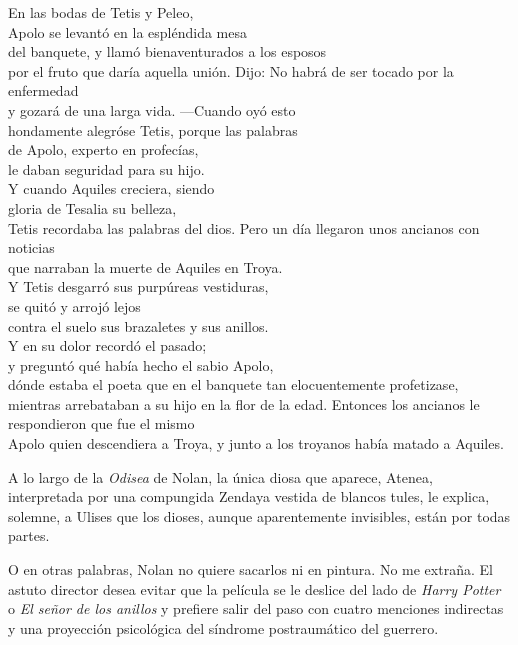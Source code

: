 \begin{versocita}
En las bodas de Tetis y Peleo,\\
Apolo se levantó en la espléndida mesa\\
del banquete, y llamó bienaventurados a los esposos\\
por el fruto que daría aquella unión.
\stanzabreak
Dijo: No habrá de ser tocado por la enfermedad\\
y gozará de una larga vida. ---Cuando oyó esto\\
hondamente alegróse Tetis, porque las palabras\\
de Apolo, experto en profecías,\\
le daban seguridad para su hijo.\\
Y cuando Aquiles creciera, siendo\\
gloria de Tesalia su belleza,\\
Tetis recordaba las palabras del dios.
\stanzabreak
Pero un día llegaron unos ancianos con noticias\\
que narraban la muerte de Aquiles en Troya.\\
Y Tetis desgarró sus purpúreas vestiduras,\\
se quitó y arrojó lejos\\
contra el suelo sus brazaletes y sus anillos.\\
Y en su dolor recordó el pasado;\\
y preguntó qué había hecho el sabio Apolo,\\
dónde estaba el poeta que en el banquete tan elocuentemente profetizase,\\
mientras arrebataban a su hijo en la flor de la edad.
\stanzabreak
Entonces los ancianos le respondieron que fue el mismo\\
Apolo quien descendiera a Troya, y junto a los troyanos había matado a Aquiles.
\end{versocita}


A lo largo de la \emph{Odisea} de Nolan, la única diosa que aparece, Atenea, interpretada por una compungida Zendaya vestida de blancos tules, le explica, solemne, a Ulises que los dioses, aunque aparentemente invisibles, están por todas partes. 

O en otras palabras, Nolan no quiere sacarlos ni en pintura. No me extraña. El astuto director desea evitar que la película se le deslice del lado de \emph{Harry Potter} o \emph{El señor de los anillos} y prefiere salir del paso con cuatro menciones indirectas y una proyección psicológica del síndrome postraumático del guerrero.

